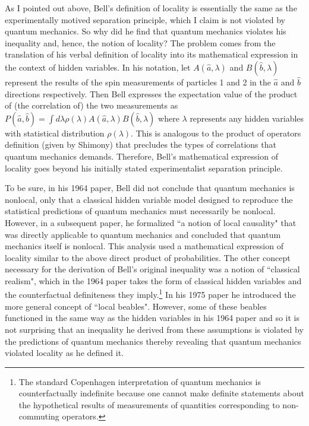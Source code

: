 \documentclass[12pt]{article}
\begin{document}
As I pointed out above, Bell's definition of locality is essentially the same as the experimentally motived separation principle, which I claim is not violated by quantum mechanics.  So why did he find that quantum mechanics violates his inequality and, hence, the notion of locality?  The problem comes from the translation of his verbal definition of locality into its mathematical expression in the context of hidden variables.  In his notation, let $A(\hat{a},\lambda)$ and $B(\hat{b},\lambda)$ represent the results of the spin measurements of particles 1 and 2 in the $\hat{a}$ and $\hat{b}$ directions respectively.  Then Bell expresses the expectation value of the product of (the correlation of) the two measurements as $P(\hat{a},\hat{b}) = \int d\lambda \rho(\lambda)A(\hat{a},\lambda)B(\hat{b},\lambda)$ where $\lambda$ represents any hidden variables with statistical distribution $\rho(\lambda)$.  This is analogous to the product of operators definition (given by Shimony) that precludes the types of correlations that quantum mechanics demands.  Therefore, Bell's mathematical expression of locality goes beyond his initially stated experimentalist separation principle.

To be sure, in his 1964 paper, Bell did not conclude that quantum mechanics is nonlocal, only that a classical hidden variable model designed to reproduce the statistical predictions of quantum mechanics must necessarily be nonlocal.  However, in a subsequent paper\cite{Bel75}, he formalized ``a notion of local causality" that was directly applicable to quantum mechanics and concluded that quantum mechanics itself is nonlocal.  This analysis used a mathematical expression of locality similar to the above direct product of probabilities. The other concept necessary for the derivation of Bell's original inequality was a notion of ``classical realism", which in the 1964 paper takes the form of classical hidden variables and the counterfactual definiteness they imply.\footnote{The standard Copenhagen interpretation of quantum mechanics is counterfactually indefinite because one cannot make definite statements about the hypothetical results of measurements of quantities corresponding to non-commuting operators.} In his 1975 paper he introduced the more general concept of ``local beables".  However, some of these beables functioned in the same way as the hidden variables in his 1964 paper and so it is not surprising that an inequality he derived from these assumptions is violated by the predictions of quantum mechanics thereby revealing that quantum mechanics violated locality as he defined it.
\end{document}
